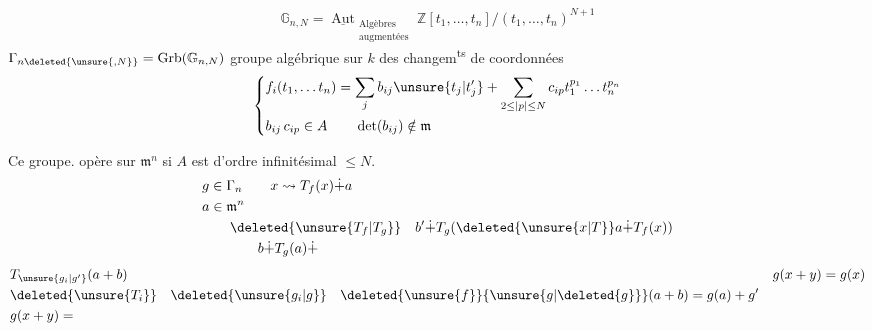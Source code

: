 \[
\mathbb G_{n,N}=\underline{\operatorname{Aut}}_{\substack{\text{Algèbres}\\\text{augmentées}}}
\mathbb Z[t_1,\ldots,t_n]/(t_1,\ldots,t_n)^{N+1}
\]
$\Gamma_{n\deleted{\unsure{,N}}}=\operatorname{Grb}(\mathbb G_{n,N})$ groupe algébrique sur $k$ des changem\textsuperscript{ts} de coordonnées
\[
\left\{\begin{aligned}
&f_i(t_1,\ldots t_n)=\sum_j b_{ij}\unsure{t_j|t'_j}+
\sum_{2\leq|p|\leq N}c_{ip}t_1^{p_1}\ldots t_n^{p_n}\\
&b_{ij}\,c_{ip}\in A\qquad\det(b_{ij})\notin\mathfrak m
\end{aligned}\right.
\]

Ce groupe. opère sur $\mathfrak m^n$ si $A$ est d'ordre infinitésimal $\leq N$. 
\[
\begin{aligned}
&g\in\Gamma_n \qquad x\leadsto T_f(x)\dot{+}a\\
&a\in\mathfrak m^n\\
&\qquad\deleted{\unsure{T_f|T_g}}\quad b'\dot{+}T_g(\deleted{\unsure{x|T}}a\dot{+}T_f(x))\\
&\qquad\qquad b\dot{+}T_g(a)\dot{+}
\end{aligned}
\]
\[
\begin{aligned}
&T_{\unsure{g_i|g'}}(a+b) &&g(x+y)=g(x)\\
&\deleted{\unsure{T_i}}\quad\deleted{\unsure{g_i|g}}\quad
\deleted{\unsure{f}}{\unsure{g|\deleted{g}}}(a+b)=g(a)+g'\\
&g(x+y)=
\end{aligned}
\]
